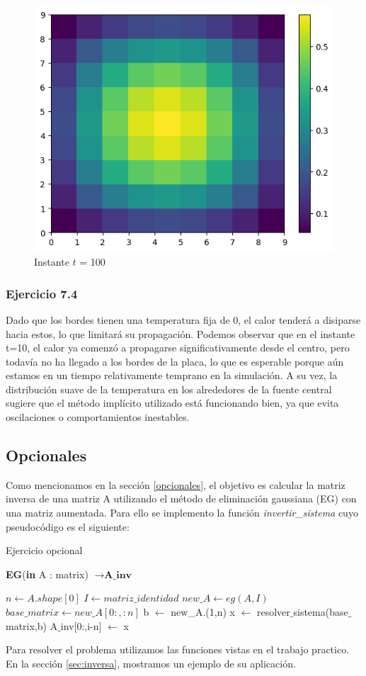 \begin{figure}[H]
\begin{minipage}[b]{0.5\linewidth}
        \vspace{4ex}
      \end{minipage}%
      \begin{minipage}[b]{0.5\linewidth}
       \centering
       \includegraphics[width=.5\linewidth]{./img/instante100.png}
      \caption{Instante $t$ = 100}\label{instante100}
        \vspace{4ex}
      \end{minipage} 
    \end{figure}


    \subsubsection{Ejercicio 7.4}
    Dado que los bordes tienen una temperatura fija de 0, el calor tenderá a disiparse hacia estos, lo que limitará su propagación.
    Podemos observar que en el instante t=10, el calor ya comenzó a propagarse significativamente desde el centro, pero todavía no ha llegado a los bordes de la placa, lo que es esperable porque aún estamos en un tiempo relativamente temprano en la simulación. A su vez, la distribución suave de la temperatura en los alrededores de la fuente central sugiere que el método implícito utilizado está funcionando bien, ya que evita oscilaciones o comportamientos inestables.
\fi


 \subsection{Opcionales}

 Como mencionamos en la sección \ref{opcionales}, el objetivo es calcular la matriz inversa de una matriz A utilizando el método de eliminación gaussiana (EG) con una matriz aumentada. Para ello se implemento la función \textit{invertir\_sistema} cuyo pseudocódigo es el siguiente: 
 
\begin{algorithm}[H]
\caption{Ejercicio opcional}
\begin{algorithmic}
\State \textbf{EG}(\textbf{in} A : matrix) $\to \textbf{A\_inv}$
 
 \State $n \gets A.shape[0]$
 \State $I \gets matriz\_identidad$
 \State $new\_A \gets eg(A,I)$
 \State $base\_matrix \gets new\_A[0:,:n]$
        \State  b $\gets$ new\_A.(1,n)
        \State x $\gets$ resolver$\_$sistema(base$\_$matrix,b)
        \State A$\_$inv[0:,i-n] $\gets$ x
\EndFor

\end{algorithmic}
\end{algorithm}

Para resolver el problema utilizamos las funciones vistas en el trabajo practico. En la sección \ref{sec:inversa}, mostramos un ejemplo de su aplicación.
